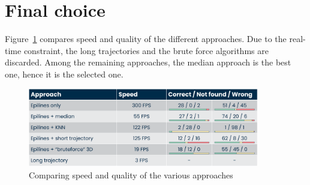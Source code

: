 \newpage
 \newpage
 \newpage
 \newpage
 \newpage
 \newpage
 \newpage
 \newpage

\section{Final choice}

Figure~\ref{fig:match:comparison} compares speed and quality of the different approaches.
Due to the real-time constraint, the long trajectories and the brute force algorithms are discarded.
Among the remaining approaches, the median approach is the best one, hence it is the selected one. 

\begin{figure}
	\centerline{\includegraphics[width=0.9\textwidth]{images/3d-matching-comparison-without-chosen.png}}
	\caption{\centering Comparing speed and quality of the various \match* approaches}
	\label{fig:match:comparison}
\end{figure}
